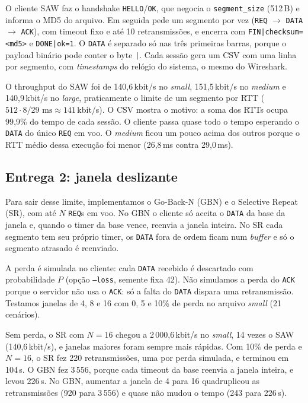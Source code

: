 \documentclass[11pt,a4paper]{article}
\begin{document}
O cliente SAW faz o handshake \texttt{HELLO}/\texttt{OK}, que negocia o
\texttt{segment\_size} (512\,B) e informa o MD5 do arquivo. Em seguida pede um
segmento por vez (\texttt{REQ} $\to$ \texttt{DATA} $\to$ \texttt{ACK}), com
timeout fixo e até 10 retransmissões, e encerra com
\texttt{FIN|checksum=<md5>} e \texttt{DONE|ok=1}. O \texttt{DATA} é separado
só nas três primeiras barras, porque o payload binário pode conter o byte
\texttt{|}. Cada sessão gera um CSV com uma linha por segmento, com
\emph{timestamps} do relógio do sistema, o mesmo do Wireshark.

O throughput do SAW foi de 140,6\,kbit/s no \emph{small}, 151,5\,kbit/s no
\emph{medium} e 140,9\,kbit/s no \emph{large}, praticamente o limite de um
segmento por RTT ($512 \cdot 8 / 29\text{ ms} \approx 141$\,kbit/s). O CSV mostra
o motivo: a soma dos RTTs ocupa 99,9\% do tempo de cada sessão. O cliente passa quase todo o
tempo esperando o \texttt{DATA} do único \texttt{REQ} em voo. O \emph{medium}
ficou um pouco acima dos outros porque o RTT médio dessa execução foi menor
(26,8\,ms contra 29,0\,ms).

\subsection{Entrega 2: janela deslizante}

Para sair desse limite, implementamos o Go-Back-N (GBN) e o Selective Repeat
(SR), com até $N$ \texttt{REQ}s em voo. No GBN o cliente só aceita o
\texttt{DATA} da base da janela e, quando o timer da base vence, reenvia a
janela inteira. No SR cada segmento tem seu próprio timer, os \texttt{DATA}
fora de ordem ficam num \emph{buffer} e só o segmento atrasado é reenviado.

A perda é simulada no cliente: cada \texttt{DATA} recebido é descartado com
probabilidade $P$ (opção \texttt{--loss}, semente fixa 42). Não simulamos a
perda do \texttt{ACK} porque o servidor não usa o \texttt{ACK}: só a falta do
\texttt{DATA} dispara uma retransmissão. Testamos janelas de 4, 8 e 16 com 0,
5 e 10\% de perda no arquivo \emph{small} (21 cenários).

Sem perda, o SR com $N=16$ chegou a 2\,000,6\,kbit/s no \emph{small}, 14
vezes o SAW (140,6\,kbit/s), e janelas maiores foram sempre mais rápidas. Com
10\% de perda e $N=16$, o SR fez 220 retransmissões, uma por perda simulada,
e terminou em 104\,s. O GBN fez 3\,556, porque cada timeout da base reenvia a
janela inteira, e levou 226\,s. No GBN, aumentar a janela de 4 para 16
quadruplicou as retransmissões (920 para 3\,556) e quase não mudou o tempo
(243 para 226\,s).
\end{document}
